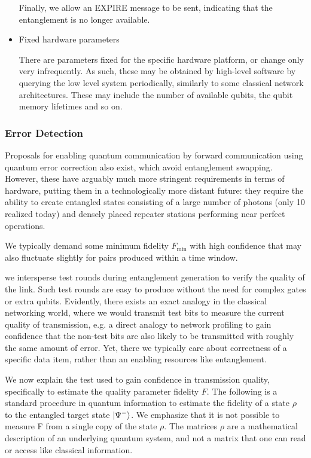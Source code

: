 \documentclass[10pt]{article}
\begin{document}
\begin{itemize}
    Finally, we allow an EXPIRE message to be sent, indicating that the entanglement is no longer available.

\item Fixed hardware parameters

There are parameters fixed for the specific hardware platform, or change only very infrequently. As such, these may be obtained by high-level software by querying the low level system periodically, similarly to some classical network architectures. These may include the number of available qubits, the qubit memory lifetimes and so on.

\end{itemize}


\subsubsection{Error Detection}

Proposals for enabling quantum communication by forward communication using quantum error correction also exist, which avoid entanglement swapping. However, these have arguably much more stringent requirements in terms of hardware, putting them in a technologically more distant future: they require the ability to create entangled states consisting of a large number of photons (only 10 realized today) and densely placed repeater stations performing near perfect operations.

We typically demand some minimum fidelity $F_{\min}$ with high confidence that may also fluctuate slightly for pairs produced within a time window.

we intersperse test rounds during entanglement generation to verify the quality of the link. Such test rounds are easy to produce without the need for complex gates or extra qubits. Evidently, there exists an exact analogy in the classical networking world, where we would transmit test bits to measure the current quality of transmission, e.g. a direct analogy to network profiling to gain confidence that the non-test bits are also likely to be transmitted with roughly the same amount of error. Yet, there we typically care about correctness of a specific data item, rather than an enabling resources like entanglement.

We now explain the test used to gain confidence in transmission quality, specifically to estimate the quality parameter fidelity $F$. The following is a standard procedure in quantum information to estimate the fidelity of a state $\rho$ to the entangled target state $\ket{\Psi^{-}}$. We emphasize that it is not possible to measure F from a single copy of the state $\rho$. The matrices $\rho$ are a mathematical description of an underlying quantum system, and not a matrix that one can read or access like classical information.
\end{document}
